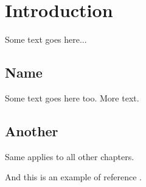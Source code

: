 \chapter{Introduction} 

Some text goes here...

\section{Name}

Some text goes here too. More text.

\section{Another}

Same applies to all other chapters.

And this is an example of reference \cite{shehory_methods_1998}.
